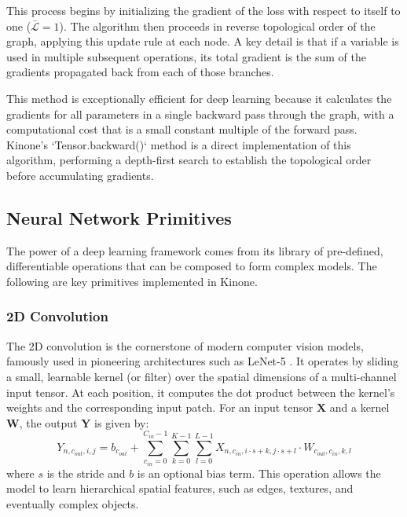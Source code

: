 \documentclass[a4paper]{article}
\begin{document}
This process begins by initializing the gradient of the loss with respect to itself to one ($\bar{\mathcal{L}} = 1$). The algorithm then proceeds in reverse topological order of the graph, applying this update rule at each node. A key detail is that if a variable is used in multiple subsequent operations, its total gradient is the sum of the gradients propagated back from each of those branches.

This method is exceptionally efficient for deep learning because it calculates the gradients for all parameters in a single backward pass through the graph, with a computational cost that is a small constant multiple of the forward pass. Kinone's `Tensor.backward()` method is a direct implementation of this algorithm, performing a depth-first search to establish the topological order before accumulating gradients.

\subsection{Neural Network Primitives}

The power of a deep learning framework comes from its library of pre-defined, differentiable operations that can be composed to form complex models. The following are key primitives implemented in Kinone.

\subsubsection{2D Convolution}
The 2D convolution is the cornerstone of modern computer vision models, famously used in pioneering architectures such as LeNet-5 \cite{lecun1998gradient}. It operates by sliding a small, learnable kernel (or filter) over the spatial dimensions of a multi-channel input tensor. At each position, it computes the dot product between the kernel's weights and the corresponding input patch. For an input tensor $\mathbf{X}$ and a kernel $\mathbf{W}$, the output $\mathbf{Y}$ is given by:
\begin{equation}
    Y_{n, c_{out}, i, j} = b_{c_{out}} + \sum_{c_{in}=0}^{C_{in}-1} \sum_{k=0}^{K-1} \sum_{l=0}^{L-1} X_{n, c_{in}, i \cdot s + k, j \cdot s + l} \cdot W_{c_{out}, c_{in}, k, l}
\end{equation}
where $s$ is the stride and $b$ is an optional bias term. This operation allows the model to learn hierarchical spatial features, such as edges, textures, and eventually complex objects.
\end{document}
